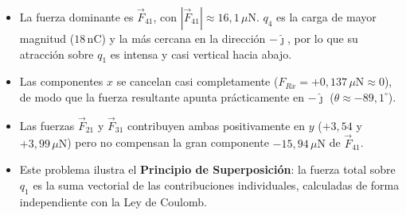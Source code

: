 \documentclass[12pt,letterpaper]{article}
\begin{document}
\begin{itemize}
    \item La fuerza dominante es $\vec{F}_{41}$, con $|\vec{F}_{41}| \approx 16{,}1\,\mu\text{N}$.
          $q_4$ es la carga de mayor magnitud ($18\,\text{nC}$) y la m\'as cercana en la
          direcci\'on $-\hat{\jmath}$, por lo que su atracci\'on sobre $q_1$ es intensa y
          casi vertical hacia abajo.

    \item Las componentes $x$ se cancelan casi completamente
          ($F_{Rx} = +0{,}137\,\mu\text{N} \approx 0$),
          de modo que la fuerza resultante apunta pr\'acticamente en $-\hat{\jmath}$
          ($\theta \approx -89{,}1^\circ$).

    \item Las fuerzas $\vec{F}_{21}$ y $\vec{F}_{31}$ contribuyen ambas positivamente
          en $y$ ($+3{,}54$ y $+3{,}99\,\mu\text{N}$) pero no compensan la gran
          componente $-15{,}94\,\mu\text{N}$ de $\vec{F}_{41}$.

    \item Este problema ilustra el \textbf{Principio de Superposici\'on}: la fuerza
          total sobre $q_1$ es la suma vectorial de las contribuciones individuales,
          calculadas de forma independiente con la Ley de Coulomb.
\end{itemize}
\end{document}

